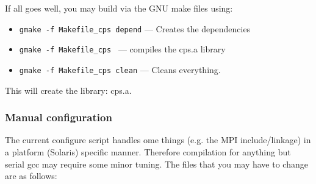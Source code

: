 \documentclass[12pt]{article}
\begin{document}
If all goes well, you may build via the GNU make files using:
\begin{itemize}
 \item{\tt gmake -f Makefile\_cps depend} --- Creates the dependencies
 \item{\tt gmake -f Makefile\_cps } --- compiles the cps.a library
 \item{\tt gmake -f Makefile\_cps clean} --- Cleans everything.
\end{itemize}
This will create the library: cps.a.

\subsubsection{Manual configuration}
The current configure script handles ome things (e.g. the MPI include/linkage)
in a platform (Solaris) specific manner.  Therefore compilation for anything but serial gcc
may require some minor tuning.  The files that you may have to change are as
follows:
\end{document}
